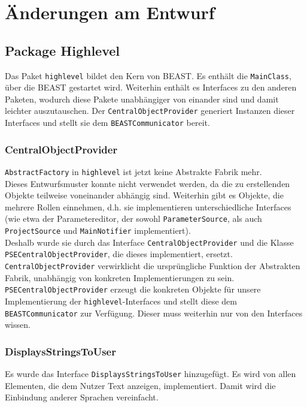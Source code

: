 \documentclass[a4paper]{scrreprt}
\begin{document}
\chapter{Änderungen am Entwurf}
\section{Package Highlevel}

Das Paket \verb!highlevel! bildet den Kern von BEAST. Es enthält die \verb!MainClass!, über die BEAST gestartet wird. Weiterhin enthält es Interfaces zu den anderen Paketen, wodurch diese Pakete unabhängiger von einander sind und damit leichter auszutauschen. Der \verb!CentralObjectProvider! generiert Instanzen dieser Interfaces und stellt sie dem \verb!BEASTCommunicator! bereit. \\

\subsection{CentralObjectProvider}
\verb!AbstractFactory! in \verb!highlevel! ist jetzt keine Abstrakte Fabrik mehr.\\ Dieses Entwurfsmuster konnte nicht verwendet werden, da die zu erstellenden Objekte teilweise voneinander abhängig sind. Weiterhin gibt es Objekte, die mehrere Rollen einnehmen, d.h. sie implementieren unterschiedliche Interfaces (wie etwa der Parametereditor, der sowohl \verb!ParameterSource!, als auch \verb!ProjectSource! und \verb!MainNotifier! implementiert). \\
Deshalb wurde sie durch das Interface \verb!CentralObjectProvider! und die Klasse\\ \verb!PSECentralObjectProvider!, die dieses implementiert, ersetzt. \verb!CentralObjectProvider! verwirklicht die ursprüngliche Funktion der Abstrakten Fabrik, unabhängig von konkreten Implementierungen zu sein. \\
\verb!PSECentralObjectProvider! erzeugt die konkreten Objekte für unsere Implementierung der \verb!highlevel!-Interfaces und stellt diese dem \verb!BEASTCommunicator! zur Verfügung. Dieser muss weiterhin nur von den Interfaces wissen. \\

\subsection{DisplaysStringsToUser}
Es wurde das Interface \verb!DisplaysStringsToUser! hinzugefügt. Es wird von allen Elementen, die dem Nutzer Text anzeigen, implementiert. Damit wird die Einbindung anderer Sprachen vereinfacht. \\
\end{document}
